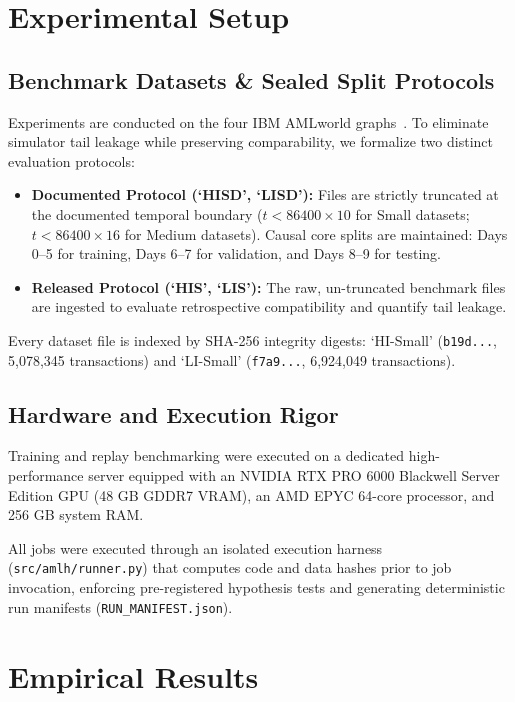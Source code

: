 \documentclass[10pt,twocolumn,letterpaper]{article}
\begin{document}
\section{Experimental Setup}
\label{sec:experiments}

\subsection{Benchmark Datasets \& Sealed Split Protocols}
Experiments are conducted on the four IBM AMLworld graphs~\cite{altman2023ibmaml}. To eliminate simulator tail leakage while preserving comparability, we formalize two distinct evaluation protocols:
\begin{itemize}[leftmargin=*]
    \item \textbf{Documented Protocol (`HISD', `LISD'):} Files are strictly truncated at the documented temporal boundary ($t < 86400 \times 10$ for Small datasets; $t < 86400 \times 16$ for Medium datasets). Causal core splits are maintained: Days 0--5 for training, Days 6--7 for validation, and Days 8--9 for testing.
    \item \textbf{Released Protocol (`HIS', `LIS'):} The raw, un-truncated benchmark files are ingested to evaluate retrospective compatibility and quantify tail leakage.
\end{itemize}

Every dataset file is indexed by SHA-256 integrity digests: `HI-Small' (\texttt{b19d...}, 5,078,345 transactions) and `LI-Small' (\texttt{f7a9...}, 6,924,049 transactions).

\subsection{Hardware and Execution Rigor}
Training and replay benchmarking were executed on a dedicated high-performance server equipped with an NVIDIA RTX PRO 6000 Blackwell Server Edition GPU (48 GB GDDR7 VRAM), an AMD EPYC 64-core processor, and 256 GB system RAM. 

All jobs were executed through an isolated execution harness (\texttt{src/amlh/runner.py}) that computes code and data hashes prior to job invocation, enforcing pre-registered hypothesis tests and generating deterministic run manifests (\texttt{RUN\_MANIFEST.json}).

\section{Empirical Results}
\label{sec:results}
\end{document}
